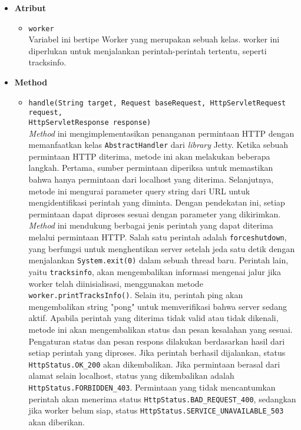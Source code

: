 \begin{itemize}
    \item \textbf{Atribut}
    \begin{itemize}
        \item \texttt{worker}
        \\ Variabel ini bertipe Worker yang merupakan sebuah kelas. worker ini diperlukan untuk menjalankan perintah-perintah tertentu, seperti tracksinfo.
    \end{itemize}
    
    \item \textbf{Method}
    \begin{itemize}
        \item \texttt{handle(String target, Request baseRequest, HttpServletRequest request, \\HttpServletResponse response)}
        \\ \textit{Method} ini mengimplementasikan penanganan permintaan HTTP dengan memanfaatkan kelas \texttt{AbstractHandler} dari \textit{library} Jetty. Ketika sebuah permintaan HTTP diterima, metode ini akan melakukan beberapa langkah. Pertama, sumber permintaan diperiksa untuk memastikan bahwa hanya permintaan dari localhost yang diterima. Selanjutnya, metode ini mengurai parameter query string dari URL untuk mengidentifikasi perintah yang diminta. Dengan pendekatan ini, setiap permintaan dapat diproses sesuai dengan parameter yang dikirimkan.
        \\ \textit{Method} ini mendukung berbagai jenis perintah yang dapat diterima melalui permintaan HTTP. Salah satu perintah adalah \texttt{forceshutdown}, yang berfungsi untuk menghentikan server setelah jeda satu detik dengan menjalankan \texttt{System.exit(0)} dalam sebuah thread baru. Perintah lain, yaitu \texttt{tracksinfo}, akan mengembalikan informasi mengenai jalur jika worker telah diinisialisasi, menggunakan metode \texttt{worker.printTracksInfo()}. Selain itu, perintah ping akan mengembalikan string "pong" untuk memverifikasi bahwa server sedang aktif. Apabila perintah yang diterima tidak valid atau tidak dikenali, metode ini akan mengembalikan status dan pesan kesalahan yang sesuai.
        \\ Pengaturan status dan pesan respons dilakukan berdasarkan hasil dari setiap perintah yang diproses. Jika perintah berhasil dijalankan, status \texttt{HttpStatus.OK\_200} akan dikembalikan. Jika permintaan berasal dari alamat selain localhost, status yang dikembalikan adalah \texttt{HttpStatus.FORBIDDEN\_403}. Permintaan yang tidak mencantumkan perintah akan menerima status \texttt{HttpStatus.BAD\_REQUEST\_400}, sedangkan jika worker belum siap, status \texttt{HttpStatus.SERVICE\_UNAVAILABLE\_503} akan diberikan.
    \end{itemize}
\end{itemize}

